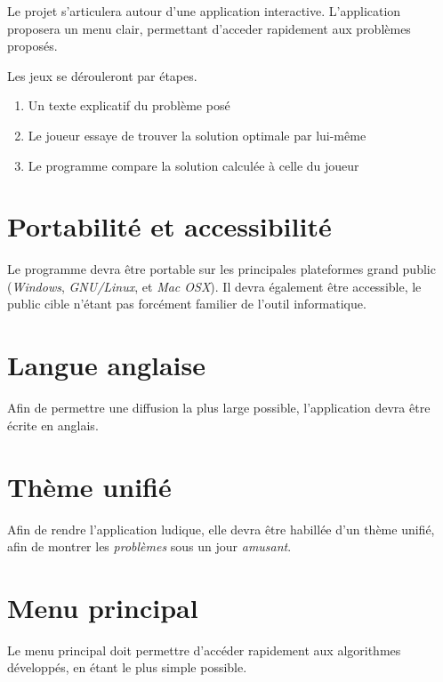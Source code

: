 Le projet s'articulera autour d'une application interactive.
L'application proposera un menu clair, permettant
d'acceder rapidement aux problèmes proposés.

Les jeux se dérouleront par étapes.
\begin{enumerate}
    \item Un texte explicatif du problème posé
    \item Le joueur essaye de trouver la solution optimale par lui-même
    \item Le programme compare la solution calculée à celle du joueur
\end{enumerate}

\section{Portabilité et accessibilité}
    Le programme devra être portable sur les principales plateformes
    grand public (\emph{Windows}, \emph{GNU/Linux}, et \emph{Mac OSX}).
    Il devra également être accessible, le public cible n'étant
    pas forcément familier de l'outil informatique.

\section{Langue anglaise}
    Afin de permettre une diffusion la plus large possible,
    l'application devra être écrite en anglais.

\section{Thème unifié}
    Afin de rendre l'application ludique, elle devra
    être habillée d'un thème unifié,
    afin de montrer les \emph{problèmes} sous un
    jour \emph{amusant}.

\section{Menu principal}
    Le menu principal doit permettre d'accéder rapidement
    aux algorithmes développés, en étant le plus simple possible.


